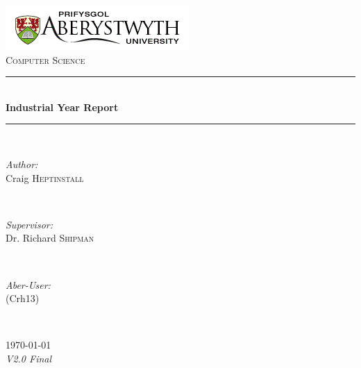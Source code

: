 \documentclass[12pt]{article}
\begin{document}
\begin{titlepage}

\newcommand{\HRule}{\rule{\linewidth}{0.5mm}} 

\center

\includegraphics{aber}\\[1cm] 

\textsc{\Large Computer Science}\\[0.5cm] 

\HRule \\[0.8cm]
{ \huge \bfseries Industrial Year Report}\\[0.4cm]
\HRule \\[1.5cm]

\begin{minipage}{0.4\textwidth}
\begin{flushleft} \large
\emph{Author:}\\
Craig \textsc{Heptinstall}
\end{flushleft}
\end{minipage}
~
\begin{minipage}{0.4\textwidth}
\begin{flushright} \large
\emph{Supervisor:} \\
Dr. Richard \textsc{Shipman}
\end{flushright}
\end{minipage}\\[0.2cm]
\begin{minipage}{0.85\textwidth}
\begin{flushleft} \large
\emph{Aber-User:}\\
(Crh13)
\end{flushleft}
\end{minipage}\\[8cm]
\begin{minipage}{0.28\textwidth}
{\large \today}\\
\large \emph{V2.0 Final}
\end{minipage}\\[2cm]

\vfill

\end{titlepage}

\pagestyle{myheadings}
\setcounter{page}{2}
\tableofcontents
\end{document}
